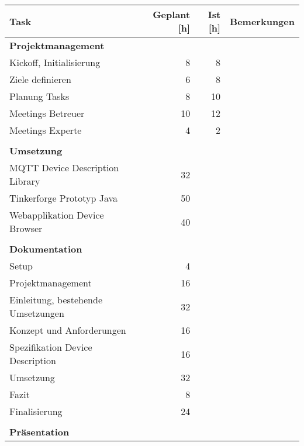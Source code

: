 \begin{table}[H]
\begin{tabularx}{\textwidth}{|l|r|r|X|}

 \hline \rowcolor{lightgray}
 {\bf Task } & { \bf Geplant [h] } & {\bf Ist [h] }  & {\bf Bemerkungen } \\  \hline
 \textbf{Projektmanagement}         &      &       &   \\ \hline
 Kickoff, Initialisierung           &   8  &   8   &   \\ \hline
 Ziele definieren                   &   6  &   8   &   \\ \hline
 Planung Tasks                      &   8  &  10   &   \\ \hline
 Meetings Betreuer                  &  10  &  12   &   \\ \hline
 Meetings Experte                   &   4  &   2   &   \\ \hline
     &      &       &   \\ \hline
 \textbf{Umsetzung}                 &      &       &   \\ \hline
 MQTT Device Description Library    &  32  &       &   \\ \hline
 Tinkerforge Prototyp Java          &  50  &       &   \\ \hline
 Webapplikation Device Browser      &  40  &       &   \\ \hline
     &      &       &   \\ \hline
 \textbf{Dokumentation}             &      &       &   \\ \hline
 Setup                              &   4  &       &   \\ \hline
 Projektmanagement                  &  16  &       &   \\ \hline
 Einleitung, bestehende Umsetzungen &  32  &       &   \\ \hline
 Konzept und Anforderungen          &  16  &       &   \\ \hline
 Spezifikation Device Description   &  16  &       &   \\ \hline
 Umsetzung                          &  32  &       &   \\ \hline
 Fazit                              &   8  &       &   \\ \hline
 Finalisierung                      &  24  &       &   \\ \hline
     &      &       &   \\ \hline
 \textbf{Präsentation}              &      &       &   \\ \hline

\end{tabularx}
\end{table}
